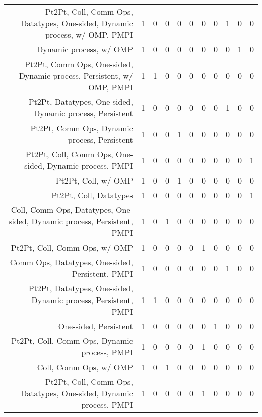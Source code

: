 {\begin{landscape}
\begin{longtable}[htb]{r|c|c|c|c|c|c|c|c|c|c}
{Pt2Pt, Coll, Comm Ops, Datatypes, One-sided, Dynamic process, w/ OMP, PMPI} & 1 & 0 & 0 & 0 & 0 & 0 & 0 & 1 & 0 & 0 \\%
{Dynamic process, w/ OMP} & 1 & 0 & 0 & 0 & 0 & 0 & 0 & 0 & 1 & 0 \\%
{Pt2Pt, Comm Ops, One-sided, Dynamic process, Persistent, w/ OMP, PMPI} & 1 & 1 & 0 & 0 & 0 & 0 & 0 & 0 & 0 & 0 \\%
{Pt2Pt, Datatypes, One-sided, Dynamic process, Persistent} & 1 & 0 & 0 & 0 & 0 & 0 & 0 & 1 & 0 & 0 \\%
{Pt2Pt, Comm Ops, Dynamic process, Persistent} & 1 & 0 & 0 & 1 & 0 & 0 & 0 & 0 & 0 & 0 \\%
{Pt2Pt, Coll, Comm Ops, One-sided, Dynamic process, PMPI} & 1 & 0 & 0 & 0 & 0 & 0 & 0 & 0 & 0 & 1 \\%
{Pt2Pt, Coll, w/ OMP} & 1 & 0 & 0 & 1 & 0 & 0 & 0 & 0 & 0 & 0 \\%
{Pt2Pt, Coll, Datatypes} & 1 & 0 & 0 & 0 & 0 & 0 & 0 & 0 & 0 & 1 \\%
{Coll, Comm Ops, Datatypes, One-sided, Dynamic process, Persistent, PMPI} & 1 & 0 & 1 & 0 & 0 & 0 & 0 & 0 & 0 & 0 \\%
{Pt2Pt, Coll, Comm Ops, w/ OMP} & 1 & 0 & 0 & 0 & 0 & 1 & 0 & 0 & 0 & 0 \\%
{Comm Ops, Datatypes, One-sided, Persistent, PMPI} & 1 & 0 & 0 & 0 & 0 & 0 & 0 & 1 & 0 & 0 \\%
{Pt2Pt, Datatypes, One-sided, Dynamic process, Persistent, PMPI} & 1 & 1 & 0 & 0 & 0 & 0 & 0 & 0 & 0 & 0 \\%
{One-sided, Persistent} & 1 & 0 & 0 & 0 & 0 & 0 & 1 & 0 & 0 & 0 \\%
{Pt2Pt, Coll, Comm Ops, Dynamic process, PMPI} & 1 & 0 & 0 & 0 & 0 & 1 & 0 & 0 & 0 & 0 \\%
{Coll, Comm Ops, w/ OMP} & 1 & 0 & 1 & 0 & 0 & 0 & 0 & 0 & 0 & 0 \\%
{Pt2Pt, Coll, Comm Ops, Datatypes, One-sided, Dynamic process, PMPI} & 1 & 0 & 0 & 0 & 0 & 1 & 0 & 0 & 0 & 0 \\%
\hline%
\end{longtable}%
\end{landscape}}%
\clearpage%
